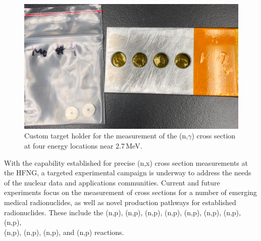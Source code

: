\begin{figure}
 \centering
 \includegraphics[width=0.75\columnwidth]{./figures/IMG_8840_cropped.JPG}
 \caption{Custom target holder for the measurement of the (n,$\gamma$) cross section at four energy locations near 2.7\,MeV.}
 \label{fig:mo_4foils}
\end{figure}






With the capability established for precise (n,x) cross section measurements at the HFNG, a targeted experimental campaign is underway to address the needs of the nuclear data and applications communities.
Current and future experiments focus on the measurement of cross sections for a number of emerging  medical radionuclides, as well as novel production pathways for established radionuclides.
These include the (n,p), (n,p), (n,p), (n,p), (n,p), (n,p), (n,p), (n,p), \\(n,p), (n,p), (n,p), and (n,p) reactions.


